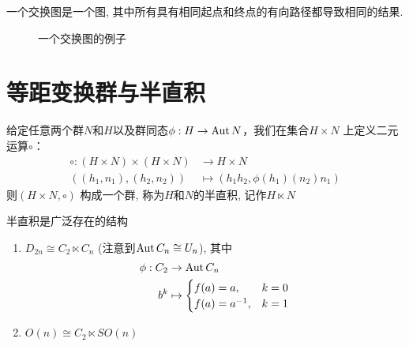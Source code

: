 \begin{definition}
    一个交换图是一个图, 其中所有具有相同起点和终点的有向路径都导致相同的结果.
    \begin{figure}[H]
        \centering
        \caption{一个交换图的例子}
    \end{figure}
\end{definition}

\section{等距变换群与半直积}

\begin{definition}
    给定任意两个群\(N\)和\(H\)以及群同态\(\phi: H \to \operatorname{\mathrm{Aut}}{N}\)，我们在集合\(H
    \times N\) 上定义二元运算\(\circ\)：
    \begin{align*}
        \circ : (H\times N)\times (H\times N) & \to H\times N \\
        ((h_{1}, n_{1}), (h_{2}, n_{2})) & \mapsto
        (h_{1}h_{2}, \phi(h_{1})(n_{2})n_{1})
    \end{align*}
    则\((H\times N, \circ )\) 构成一个群, 称为\(H\)和\(N\)的半直积,
    记作\(H\ltimes N\)
\end{definition}

半直积是广泛存在的结构
\begin{enumerate}
    \item \(D_{2n}\cong C_{2}\ltimes C_{n}\) (注意到\(\operatorname{\mathrm{Aut}}
        C_{n}\cong U_{n}\)), 其中
        \begin{align*}
            \phi: C_{2} & \to \operatorname{\mathrm{Aut}}{C_{n}} \\
            b^{k} & \mapsto
            \begin{cases}
                f(a)  = a, & k=0 \\
                f(a)  = a^{-1}, &k=1
            \end{cases}
        \end{align*}
    \item \(O(n)\cong C_{2} \ltimes SO(n)\)
\end{enumerate}

